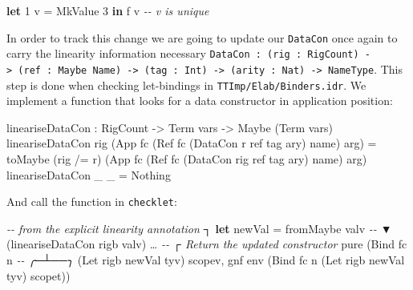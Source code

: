 \documentclass[
]{article}
\newenvironment{Shaded}{}{}
\newcommand{\CommentTok}[1]{\textcolor[rgb]{0.38,0.63,0.69}{\textit{#1}}}
\newcommand{\DataTypeTok}[1]{\textcolor[rgb]{0.56,0.13,0.00}{#1}}
\newcommand{\DecValTok}[1]{\textcolor[rgb]{0.25,0.63,0.44}{#1}}
\newcommand{\FunctionTok}[1]{\textcolor[rgb]{0.02,0.16,0.49}{#1}}
\newcommand{\KeywordTok}[1]{\textcolor[rgb]{0.00,0.44,0.13}{\textbf{#1}}}
\newcommand{\NormalTok}[1]{#1}
\newcommand{\OperatorTok}[1]{\textcolor[rgb]{0.40,0.40,0.40}{#1}}
\newcommand{\OtherTok}[1]{\textcolor[rgb]{0.00,0.44,0.13}{#1}}
\begin{document}
\begin{Shaded}
\begin{Highlighting}[]
\KeywordTok{let} \DecValTok{1}\NormalTok{ v }\OtherTok{=} \DataTypeTok{MkValue} \DecValTok{3} \KeywordTok{in}
\NormalTok{    f v }\CommentTok{{-}{-} v is unique}
\end{Highlighting}
\end{Shaded}

In order to track this change we are going to update our
\texttt{DataCon} once again to carry the linearity information necessary
\texttt{DataCon\ :\ (rig\ :\ RigCount)\ -\textgreater{}\ (ref\ :\ Maybe\ Name)\ -\textgreater{}\ (tag\ :\ Int)\ -\textgreater{}\ (arity\ :\ Nat)\ -\textgreater{}\ NameType}.
This step is done when checking let-bindings in
\texttt{TTImp/Elab/Binders.idr}. We implement a function that looks for
a data constructor in application position:

\begin{Shaded}
\begin{Highlighting}[]
\NormalTok{lineariseDataCon }\OperatorTok{:} \DataTypeTok{RigCount} \OtherTok{{-}\textgreater{}} \DataTypeTok{Term}\NormalTok{ vars }
                \OtherTok{{-}\textgreater{}} \DataTypeTok{Maybe}\NormalTok{ (}\DataTypeTok{Term}\NormalTok{ vars)}
\NormalTok{lineariseDataCon rig }
\NormalTok{  (}\DataTypeTok{App}\NormalTok{ fc (}\DataTypeTok{Ref}\NormalTok{ fc\textquotesingle{} (}\DataTypeTok{DataCon}\NormalTok{ r ref tag ary) name) arg) }\OtherTok{=}
\NormalTok{    toMaybe }
\NormalTok{      (rig }\OperatorTok{/=}\NormalTok{ r) }
\NormalTok{      (}\DataTypeTok{App}\NormalTok{ fc (}\DataTypeTok{Ref}\NormalTok{ fc\textquotesingle{} (}\DataTypeTok{DataCon}\NormalTok{ rig ref tag ary) name) arg)}
\NormalTok{lineariseDataCon \_ \_ }\OtherTok{=} \DataTypeTok{Nothing}
\end{Highlighting}
\end{Shaded}

And call the function in \texttt{checklet}:

\begin{Shaded}
\begin{Highlighting}[]
\CommentTok{{-}{-}  from the explicit linearity annotation ┐}
\KeywordTok{let}\NormalTok{ newVal }\OtherTok{=}\NormalTok{ fromMaybe valv }\CommentTok{{-}{-}             ▼}
\NormalTok{                       (lineariseDataCon rigb valv)}
\NormalTok{…}
                \CommentTok{{-}{-}   ┌ Return the updated constructor}
\FunctionTok{pure}\NormalTok{ (}\DataTypeTok{Bind}\NormalTok{ fc n }\CommentTok{{-}{-} ╭─┴──╮}
\NormalTok{         (}\DataTypeTok{Let}\NormalTok{ rigb newVal tyv) scopev,}
\NormalTok{         gnf env (}\DataTypeTok{Bind}\NormalTok{ fc n (}\DataTypeTok{Let}\NormalTok{ rigb newVal\textquotesingle{} tyv) scopet))}
\end{Highlighting}
\end{Shaded}
\end{document}
